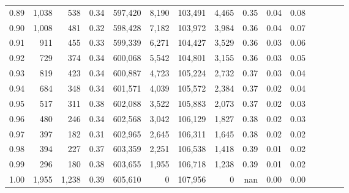 \begin{tabular}{rrrcrrrrrrrrrrr}
0.89 &   1,038 &    538 &                                       0.34 &  597,420 &    8,190 &  103,491 &    4,465 &  0.35 &  0.04 &                         0.08 \\
0.90 &   1,008 &    481 &                                       0.32 &  598,428 &    7,182 &  103,972 &    3,984 &  0.36 &  0.04 &                         0.07 \\
0.91 &     911 &    455 &                                       0.33 &  599,339 &    6,271 &  104,427 &    3,529 &  0.36 &  0.03 &                         0.06 \\
0.92 &     729 &    374 &                                       0.34 &  600,068 &    5,542 &  104,801 &    3,155 &  0.36 &  0.03 &                         0.05 \\
0.93 &     819 &    423 &                                       0.34 &  600,887 &    4,723 &  105,224 &    2,732 &  0.37 &  0.03 &                         0.04 \\
0.94 &     684 &    348 &                                       0.34 &  601,571 &    4,039 &  105,572 &    2,384 &  0.37 &  0.02 &                         0.04 \\
0.95 &     517 &    311 &                                       0.38 &  602,088 &    3,522 &  105,883 &    2,073 &  0.37 &  0.02 &                         0.03 \\
0.96 &     480 &    246 &                                       0.34 &  602,568 &    3,042 &  106,129 &    1,827 &  0.38 &  0.02 &                         0.03 \\
0.97 &     397 &    182 &                                       0.31 &  602,965 &    2,645 &  106,311 &    1,645 &  0.38 &  0.02 &                         0.02 \\
0.98 &     394 &    227 &                                       0.37 &  603,359 &    2,251 &  106,538 &    1,418 &  0.39 &  0.01 &                         0.02 \\
0.99 &     296 &    180 &                                       0.38 &  603,655 &    1,955 &  106,718 &    1,238 &  0.39 &  0.01 &                         0.02 \\
1.00 &   1,955 &  1,238 &                                       0.39 &  605,610 &        0 &  107,956 &        0 &   nan &  0.00 &                         0.00 \\
\bottomrule
\end{tabular}
